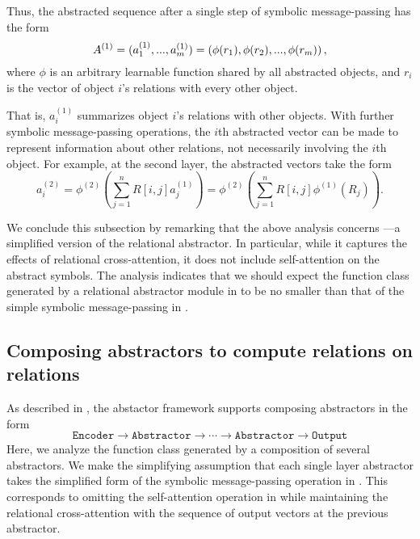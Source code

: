 Thus, the abstracted sequence after a single step of symbolic message-passing has the form
\begin{equation}
	\label{eq:abstracted_seq_1_layer_abstracter}
	A^{(1)} = (a_1^{(1)}, ..., a_\m^{(1)}) = \left(\phi(r_1), \phi(r_2), ..., \phi(r_\m)\right),
\end{equation}
where $\phi$ is an arbitrary learnable function shared by all abstracted objects, and $r_i$ is the vector of object $i$'s relations with every other object.

That is, $a_i^{(1)}$ summarizes object $i$'s relations with other objects. With further symbolic message-passing operations, the $i$th abstracted vector can be made to represent information about other relations, not necessarily involving the $i$th object. For example, at the second layer, the abstracted vectors take the form
\begin{equation}
	a_i^{(2)} = \phi^{(2)} \left( \sum_{j=1}^{n} R[i,j] a_j^{(1)} \right) = \phi^{(2)} \left( \sum_{j=1}^{n} R[i,j] \phi^{(1)}(R_j) \right).
\end{equation}

We conclude this subsection by remarking that the above analysis concerns ---a simplified version of the relational  abstractor. In particular, while it captures the effects of relational cross-attention, it does not include self-attention on the abstract symbols. The analysis indicates that we should expect the function class generated by a relational  abstractor module in  to be no smaller than that of the simple symbolic message-passing in .


\subsection{Composing  abstractors to compute relations on relations}
\label{ssec:compsing_abstracters}

As described in , the abstactor framework supports composing  abstractors in the form
\begin{equation*}
	\texttt{Encoder} \to \texttt{Abstractor} \to \cdots \to \texttt{Abstractor} \to \texttt{Output}
\end{equation*}
Here, we analyze the function class generated by a composition of several abstractors. We make the simplifying assumption that each single layer abstractor takes the simplified form of the symbolic message-passing operation in . This corresponds to omitting the self-attention operation in  while maintaining the relational cross-attention with the sequence of output vectors at the previous  abstractor.

